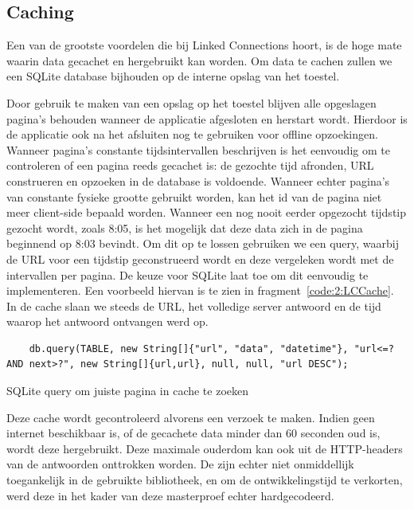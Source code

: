 \subsection{Caching}
Een van de grootste voordelen die bij Linked Connections hoort, is de hoge mate waarin data gecachet en hergebruikt kan worden. Om data te cachen zullen we een SQLite database bijhouden op de interne opslag van het toestel.

Door gebruik te maken van een opslag op het toestel blijven alle opgeslagen pagina's behouden wanneer de applicatie afgesloten en herstart wordt. Hierdoor is de applicatie ook na het afsluiten nog te gebruiken voor offline opzoekingen. Wanneer pagina's constante tijdsintervallen beschrijven is het eenvoudig om te controleren of een pagina reeds gecachet is: de gezochte tijd afronden, URL construeren en opzoeken in de database is voldoende. Wanneer echter pagina's van constante fysieke grootte gebruikt worden, kan het id van de pagina niet meer client-side bepaald worden. Wanneer een nog nooit eerder opgezocht tijdstip gezocht wordt, zoals 8:05, is het mogelijk dat deze data zich in de pagina beginnend op 8:03 bevindt. Om dit op te lossen gebruiken we een query, waarbij de URL voor een tijdstip geconstrueerd wordt en deze vergeleken wordt met de intervallen per pagina. De keuze voor SQLite laat toe om dit eenvoudig te implementeren. Een voorbeeld hiervan is te zien in fragment~\ref{code:2:LCCache}. In de cache slaan we steeds de URL, het volledige server antwoord en de tijd waarop het antwoord ontvangen werd op.

\begin{listing}[h]
	\begin{verbatim}
    db.query(TABLE, new String[]{"url", "data", "datetime"}, "url<=? AND next>?", new String[]{url,url}, null, null, "url DESC");
	\end{verbatim}
	\caption[Zoeken van pagina's in offline cache]{SQLite query om juiste pagina in cache te zoeken}
	\label{code:2:LCCache}
\end{listing}

Deze cache wordt gecontroleerd alvorens een verzoek te maken. Indien geen internet beschikbaar is, of de gecachete data minder dan 60 seconden oud is, wordt deze hergebruikt. Deze maximale ouderdom kan ook uit de HTTP-headers van de antwoorden onttrokken worden. De  zijn echter niet onmiddellijk toegankelijk in de gebruikte bibliotheek, en om de ontwikkelingstijd te verkorten, werd deze in het kader van deze masterproef echter hardgecodeerd.

